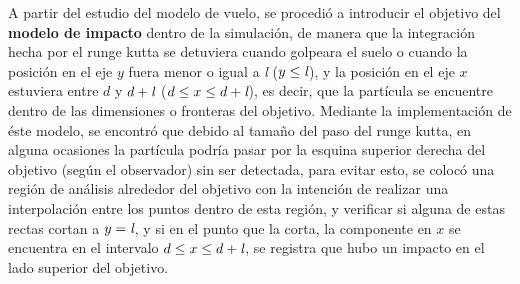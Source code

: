 \documentclass[11pt,letterpaper,twocolumn]{article}
\begin{document}
\par 
A partir del estudio del modelo de vuelo, se procedió a introducir el objetivo del \textbf{modelo de impacto} dentro de la simulación, de manera que la integración hecha por el runge kutta se detuviera cuando golpeara el suelo o cuando la posición en el eje $y$ fuera menor o igual a \emph{l} ($y \leq \emph{l}$), y la posición en el eje $x$ estuviera entre $d$ y $d + \emph{l}$   ($d \leq x \leq d + \emph{l}$), es decir, que la partícula se encuentre dentro de las dimensiones o fronteras del objetivo. Mediante la implementación de éste modelo, se encontró que debido al tamaño del paso del runge kutta, en alguna ocasiones la partícula podría pasar por la esquina superior derecha del objetivo (según el observador) sin ser detectada, para evitar esto, se colocó una región de análisis alrededor del objetivo con la intención de realizar una interpolación entre los puntos dentro de esta región, y verificar si alguna de estas rectas cortan a $y=\emph{l}$, y si en el punto que la corta, la componente en $x$ se encuentra en el intervalo $d \leq x \leq d+ \emph{l}$, se registra que hubo un impacto en el lado superior del objetivo.\\ 
\end{document}
